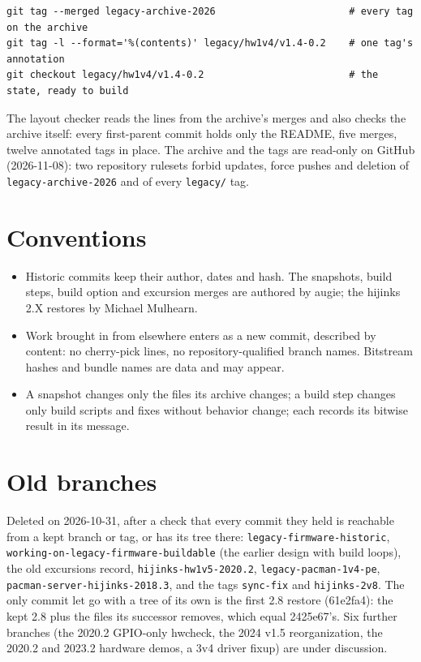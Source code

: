 \documentclass[11pt]{article}
\newcommand{\br}[1]{\texttt{#1}}
\newcommand{\h}[1]{\texttt{#1}}
\begin{document}
\begin{verbatim}
git tag --merged legacy-archive-2026                       # every tag on the archive
git tag -l --format='%(contents)' legacy/hw1v4/v1.4-0.2    # one tag's annotation
git checkout legacy/hw1v4/v1.4-0.2                         # the state, ready to build
\end{verbatim}

The layout checker reads the lines from the archive's merges and also checks the archive itself:  every first-parent
commit holds only the README, five merges, twelve annotated tags in place.  The archive and the tags are read-only on
GitHub (2026-11-08):  two repository rulesets forbid updates, force pushes and deletion of \br{legacy-archive-2026} and
of every \h{legacy/} tag.

\section{Conventions}

\begin{itemize}
\item Historic commits keep their author, dates and hash.  The snapshots, build steps, build option and excursion
  merges are authored by augie; the hijinks 2.X restores by Michael Mulhearn.
\item Work brought in from elsewhere enters as a new commit, described by content: no cherry-pick lines, no
  repository-qualified branch names.  Bitstream hashes and bundle names are data and may appear.
\item A snapshot changes only the files its archive changes; a build step changes only build scripts and fixes
  without behavior change; each records its bitwise result in its message.
\end{itemize}

\section{Old branches}\label{sec:old}

Deleted on 2026-10-31, after a check that every commit they held is reachable from a kept branch or tag, or has its
tree there: \br{legacy-firmware-historic}, \br{working-on-legacy-firmware-buildable} (the earlier design with
build loops), the old excursions record, \br{hijinks-hw1v5-2020.2}, \br{legacy-pacman-1v4-pe},
\br{pacman-server-hijinks-2018.3}, and the tags \h{sync-fix} and \h{hijinks-2v8}.  The only commit let go
with a tree of its own is the first 2.8 restore (61e2fa4): the kept 2.8 plus the files its successor removes,
which equal 2425e67's.  Six further branches (the 2020.2 GPIO-only hwcheck, the 2024 v1.5 reorganization, the
2020.2 and 2023.2 hardware demos, a 3v4 driver fixup) are under discussion.
\end{document}
